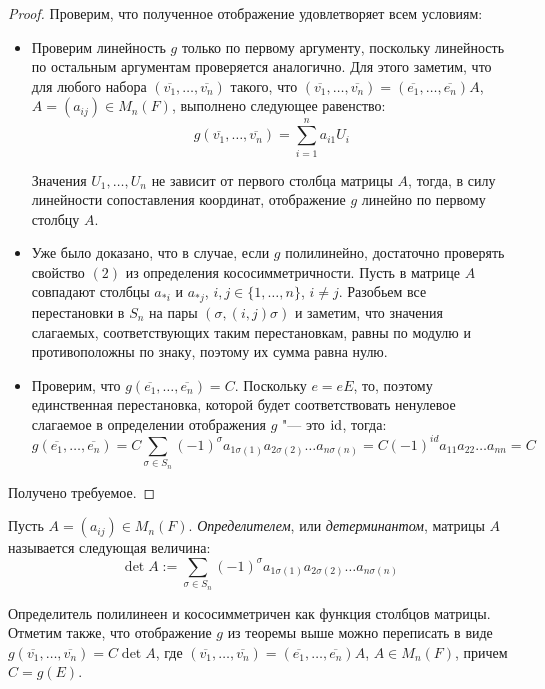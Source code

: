 \begin{proof}
	Проверим, что полученное отображение удовлетворяет всем условиям:
	\begin{itemize}
		\item Проверим линейность $g$ только по первому аргументу, поскольку линейность по оста\-льным аргументам проверяется аналогично. Для этого заметим, что для любого набора $(\overline{v_1}, \dots, \overline{v_n})$ такого, что $(\overline{v_1}, \dots, \overline{v_n}) = (\overline{e_1}, \dots, \overline{e_n})A$, $A = (a_{ij}) \in M_n(F)$, выполнено следующее равенство: \[g(\overline{v_1}, \dots, \overline{v_n}) = \sum_{i = 1}^na_{i1}U_i\]
		
		Значения $U_1, \dotsc, U_n$ не зависит от первого столбца матрицы $A$, тогда, в силу линейности сопоставления координат, отображение $g$ линейно по первому столбцу $A$.
		
		\item Уже было доказано, что в случае, если $g$ полилинейно, достаточно проверять свойство $(2)$ из определения кососимметричности. Пусть в матрице $A$ совпадают столбцы $a_{*i}$ и $a_{*j}$, $i, j \in \{1, \dotsc, n\}$, $i \ne j$. Разобьем все перестановки в $S_n$ на пары $(\sigma, (i,j)\sigma)$ и заметим, что значения слагаемых, соответствующих таким перестановкам, равны по модулю и противоположны по знаку, поэтому их сумма равна нулю.
		
		\item Проверим, что $g(\overline{e_1}, \dotsc, \overline{e_n}) = C$. Поскольку $e = eE$, то, поэтому единственная перестановка, которой будет соответствовать ненулевое слагаемое в определении отображения $g$ "--- это $\mathrm{id}$, тогда:
		\[g(\overline{e_1}, \dots, \overline{e_n}) = C\sum_{\sigma \in S_n}(-1)^\sigma a_{1 \sigma(1)}a_{2 \sigma(2)}\dots a_{n \sigma(n)} = C(-1)^{id}a_{11}a_{22}\dots a_{nn} = C\]
	\end{itemize}
	
	Получено требуемое.
\end{proof}

\begin{definition}
	Пусть $A = (a_{ij}) \in M_n(F)$. \textit{Определителем}, или \textit{детерминантом}, матрицы $A$ называется следующая величина:
	\[\det{A} := \sum_{\sigma \in S_n}(-1)^\sigma a_{1 \sigma(1)}a_{2 \sigma(2)}\dots a_{n \sigma(n)}\]
\end{definition}

\begin{note}
	Определитель полилинеен и кососимметричен как функция столбцов матрицы. Отметим также, что отображение $g$ из теоремы выше можно переписать в виде $g(\overline{v_1}, \dots, \overline{v_n}) = C\det{A}$, где $(\overline{v_1}, \dots, \overline{v_n}) = (\overline{e_1}, \dots, \overline{e_n})A$, $A \in M_n(F)$, причем $C = g(E)$.
\end{note}

